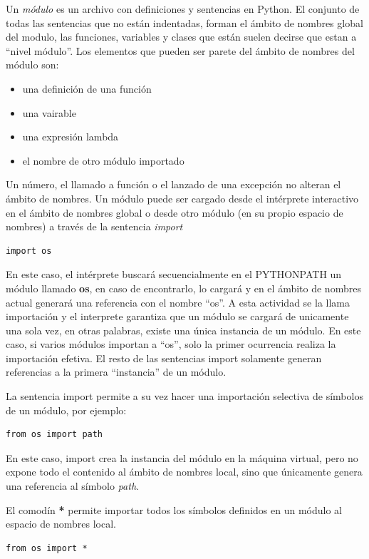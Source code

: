 \documentclass[a4paper]{report}
\begin{document}
Un \emph{módulo} es un archivo con definiciones y sentencias en Python.
El conjunto de todas las sentencias que no están indentadas, forman el ámbito de
nombres global del modulo,
las funciones, variables y clases que están suelen decirse que estan a ``nivel
módulo''. Los elementos que pueden
ser parete del ámbito de nombres del módulo son:
\begin{itemize}
  \item una definición de una función
  \item una vairable
  \item una expresión lambda
  \item el nombre de otro módulo importado
\end{itemize}


Un número, el llamado a función o el lanzado de una excepción no alteran el
ámbito de nombres.
Un módulo puede ser cargado desde el intérprete interactivo en el ámbito de
nombres global
o desde otro módulo (en su propio espacio de nombres) a través de 
la sentencia \emph{import}
\begin{lstlisting}[style=python]
import os
\end{lstlisting}
En este caso, el intérprete buscará secuencialmente en el PYTHONPATH un módulo
llamado \textbf{os}, 
en caso de encontrarlo, lo cargará y en el ámbito de nombres actual generará una
referencia con el 
nombre ``os''. A esta actividad se la llama importación y el interprete
garantiza que un módulo
se cargará de unicamente una sola vez, en otras palabras, existe una única
instancia de un módulo.
En este caso, si varios módulos importan a ``os'', solo la primer ocurrencia
realiza la importación efetiva.
El resto de las sentencias import solamente generan referencias a la primera
``instancia'' de un módulo.

La sentencia import permite a su vez hacer una importación selectiva de símbolos
de un módulo, 
por ejemplo:
\begin{lstlisting}[style=python]
from os import path
\end{lstlisting}
En este caso, import crea la instancia del módulo en la máquina virtual, pero no
expone todo el contenido
al ámbito de nombres local, sino que únicamente genera una referencia al símbolo
\emph{path}.

El comodín \textbf{*} permite importar todos los símbolos definidos en un módulo
al espacio de nombres local.
\begin{lstlisting}[style=python]
from os import *
\end{lstlisting}
\end{document}
